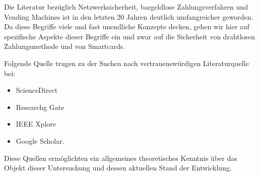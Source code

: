 Die Literatur bezüglich Netzwerksicherheit, bargeldlose Zahlungsverfahren und Vending Machines ist in den 
letzten 20 Jahren deutlich umfangreicher geworden. Da diese Begriffe viele und fast unendliche Konzepte 
decken, gehen wir hier auf spezifische Aspekte dieser Begriffe ein und zwar auf die Sicherheit von drahtlosen 
Zahlungsmethode und von Smartcards. 

Folgende Quelle trugen zu der Suchen nach vertrauenswürdigen Literaturquelle bei:

\begin{itemize}
    \item ScienceDirect
    \item Researchg Gate
    \item IEEE Xplore
    \item Google Scholar.
\end{itemize}

Diese Quellen ermöglichten ein allgemeines theoretisches Kenntnis über das Objekt dieser Untersuchung und dessen aktuellen 
Stand der Entwicklung.
